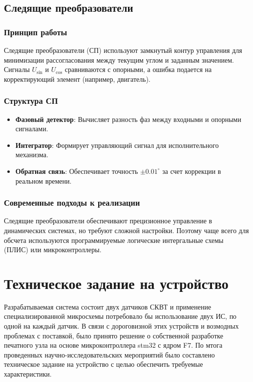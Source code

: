 \subsection{Следящие преобразователи}
\subsubsection*{Принцип работы}
Следящие преобразователи (СП) используют замкнутый контур управления для минимизации рассогласования между текущим углом и заданным значением. 
Сигналы \(U_{\sin}\) и \(U_{\cos}\) сравниваются с опорными, а ошибка подается на корректирующий элемент (например, двигатель). \cite{Anufriev2014} \cite{Safronov}

\subsubsection{Структура СП}
\begin{itemize}
    \item \textbf{Фазовый детектор}: Вычисляет разность фаз между входными и опорными сигналами.
    \item \textbf{Интегратор}: Формирует управляющий сигнал для исполнительного механизма.
    \item \textbf{Обратная связь}: Обеспечивает точность \(\pm0.01^\circ\) за счет коррекции в реальном времени.
\end{itemize}

\subsubsection{Современные подходы к реализации}
Следящие преобразователи обеспечивают прецизионное управление в динамических системах, но требуют сложной настройки.
Поэтому чаще всего для обсчета используются программируемые логические интергальные схемы (ПЛИС) или микроконтроллеры.\cite{MilandrSKVT}

\section{Техническое задание на устройство}
Разрабатываемая система состоит двух датчиков СКВТ и применение специализированной микросхемы потребовало бы использование двух ИС, по одной на каждый датчик.
В связи с дороговизной этих устройств и возмодных проблемах с поставкой, было принято решение о собственной разработке печатного узла на основе микроконтроллера stm32 с ядром F7.
По мтога проведенных научно-исследовательских мероприятий было составлено техническое задание на устройство с целью обеспечить требуемые характеристики.

